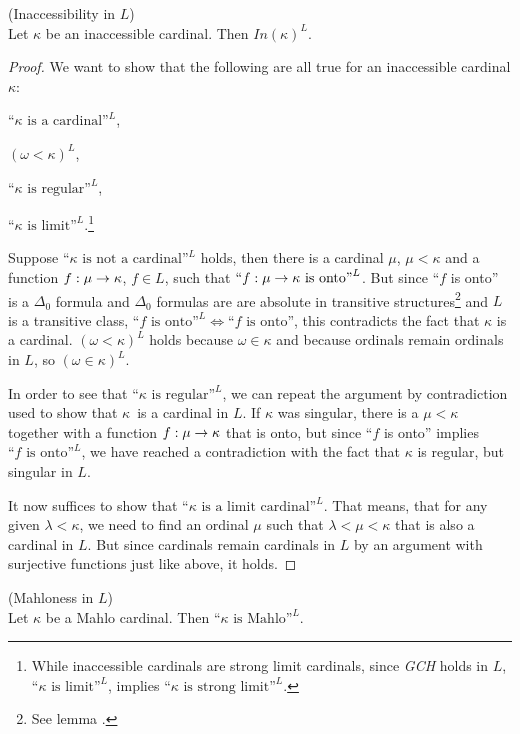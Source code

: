 \begin{theorem}{(Inaccessibility in $L$)}\label{theorem:inaccessible_in_l}\\
Let $\kappa$ be an inaccessible cardinal. Then $In(\kappa)^L$.
\end{theorem}
\begin{proof}
We want to show that the following are all true for an inaccessible cardinal $\kappa$:
\bce[(i)] 
\item $\mbox{``$\kappa$ is a cardinal''}^L$,
\item $(\omega < \kappa)^L$,
\item $\mbox{``$\kappa$ is regular''}^L$,
\item $\mbox{``$\kappa$ is limit''}^L$.\footnote{While inaccessible cardinals are strong limit cardinals, since \emph{GCH} holds in $L$, $\mbox{``$\kappa$ is limit''}^L$,
implies $\mbox{``$\kappa$ is strong limit''}^L$.}
\ece

Suppose $\mbox{``$\kappa$ is not a cardinal''}^L$ holds, then there is a cardinal $\mu$, $\mu < \kappa$ and a function $f:\mu\rightarrow\kappa$, $f \in L$, such that $\mbox{``$f:\mu\rightarrow\kappa$ is onto''}^L$. But since ``$f$ is onto'' is a $\Delta_0$ formula and $\Delta_0$ formulas are are absolute in transitive structures\footnote{See lemma .} and $L$ is a transitive class, $\mbox{``$f$ is onto''}^L \iff \mbox{``$f$ is onto''}$, this contradicts the fact that $\kappa$ is a cardinal.
$(\omega < \kappa)^L$ holds because $\omega \in \kappa$ and because ordinals remain ordinals in $L$, so $(\omega \in \kappa)^L$.

In order to see that $\mbox{``$\kappa$ is regular''}^L$, we can repeat the argument by contradiction used to show that $\kappa$ is a cardinal in $L$. If $\kappa$ was singular, there is a $\mu < \kappa$ together with a function $f: \mu \rightarrow \kappa$ that is onto, but since ``$f$ is onto'' implies $\mbox{``$f$ is onto''}^L$, we have reached a contradiction with the fact that $\kappa$ is regular, but singular in $L$.

It now suffices to show that $\mbox{``$\kappa$ is a limit cardinal''}^L$. That means, that for any given $\lambda<\kappa$, we need to find an ordinal $\mu$ such that $\lambda < \mu < \kappa$ that is also a cardinal in $L$. But since cardinals remain cardinals in $L$ by an argument with surjective functions just like above, it holds.\end{proof}

\begin{theorem}{(Mahloness in $L$)}\label{theorem:mahlo_in_l}\\
Let $\kappa$ be a Mahlo cardinal. Then $\mbox{``$\kappa$ is Mahlo''}^L$.
\end{theorem}

